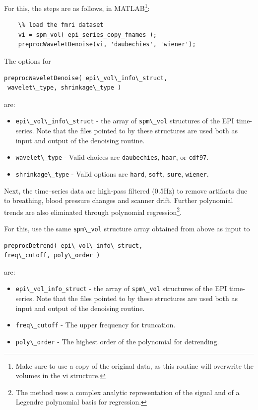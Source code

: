 For this, the steps are as follows, in MATLAB\footnote{Make sure to use a copy of the original data, as this
routine will overwrite the volumes in the vi structure.}:
\begin{verbatim}
    \% load the fmri dataset
    vi = spm_vol( epi_series_copy_fnames );
    preprocWaveletDenoise(vi, 'daubechies', 'wiener');
\end{verbatim}

The options for
\begin{verbatim}
preprocWaveletDenoise( epi\_vol\_info\_struct,
 wavelet\_type, shrinkage\_type )
\end{verbatim}
are:
\begin{itemize}
  \item \verb"epi\_vol\_info\_struct" - the array of \verb"spm\_vol" structures of the EPI time-series. Note that the
  files pointed to by these structures are used both as input and output of the denoising routine.
  \item \verb"wavelet\_type" - Valid choices are \verb"daubechies", \verb"haar", or \verb"cdf97".
  \item \verb"shrinkage\_type" - Valid options are \verb"hard", \verb"soft", \verb"sure", \verb"wiener".
\end{itemize}

Next, the time--series data are high-pass filtered ($0.5$Hz) to remove artifacts due
to breathing, blood pressure changes and scanner drift. Further polynomial trends are also eliminated through
polynomial regression\footnote{The method uses a complex analytic representation of the signal and of
a Legendre polynomial basis for regression.}.

For this, use the same \verb"spm\_vol" structure array obtained from above as input to
\begin{verbatim}
preprocDetrend( epi\_vol\_info\_struct,
freq\_cutoff, poly\_order )
\end{verbatim}
are:
\begin{itemize}
  \item \verb"epi\_vol_info_struct" - the array of \verb"spm\_vol" structures of the EPI time-series. Note that the
  files pointed to by these structures are used both as input and output of the denoising routine.
  \item \verb"freq\_cutoff" - The upper frequency for truncation.
  \item \verb"poly\_order" - The highest order of the polynomial for detrending.
\end{itemize}
%
